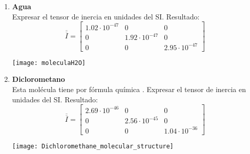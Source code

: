 \documentclass[11pt, spanish, a4paper, twoside]{article}
\begin{document}
\begin{enumerate}
	\item 
	\begin{minipage}[t][3cm]{0.73\textwidth}
	\textbf{Agua}\\
		Expresar el tensor de inercia en unidades del SI.
		Resultado:\\
		\[
			\overline{\overline{I}} = \left[\begin{matrix}1.02 \cdot 10^{-47} & 0 & 0\\0 & 1.92 \cdot 10^{-47} & 0\\0 & 0 & 2.95 \cdot 10^{-47}\end{matrix}\right]
		\]
	\end{minipage}
	\begin{minipage}[c][0.5cm][t]{0.2\textwidth}
		\texttt{[image: moleculaH2O]}
	\end{minipage}

	

	\item 
	\begin{minipage}[t][3cm]{0.73\textwidth}
	\textbf{Diclorometano}\\
	Esta molécula tiene por fórmula química . Expresar el tensor de inercia en unidades del SI.
		Resultado:\\
		\[
			\overline{\overline{I}} = \left[\begin{matrix}2.69 \cdot 10^{-46} & 0 & 0\\0 & 2.56 \cdot 10^{-45} & 0\\0 & 0 & 1.04 \cdot 10^{-36}\end{matrix}\right]
		\]
	\end{minipage}
	\begin{minipage}[c][0.5cm][t]{0.2\textwidth}
		\texttt{[image: Dichloromethane\_molecular\_structure]}
	\end{minipage}




\end{enumerate}
\end{document}

